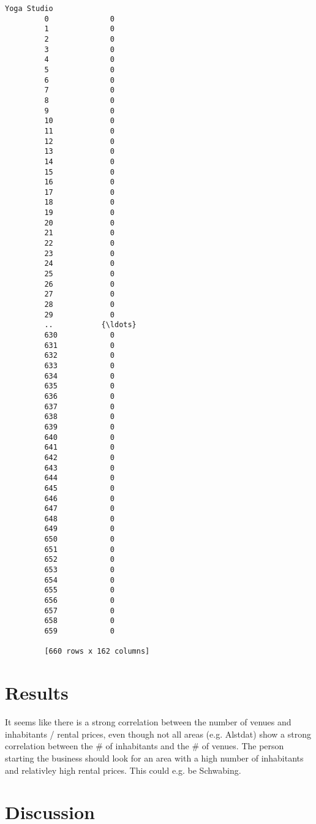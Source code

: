 \documentclass[11pt]{article}
\begin{document}
\begin{Verbatim}[commandchars=\\\{\}]
              Yoga Studio  
         0              0  
         1              0  
         2              0  
         3              0  
         4              0  
         5              0  
         6              0  
         7              0  
         8              0  
         9              0  
         10             0  
         11             0  
         12             0  
         13             0  
         14             0  
         15             0  
         16             0  
         17             0  
         18             0  
         19             0  
         20             0  
         21             0  
         22             0  
         23             0  
         24             0  
         25             0  
         26             0  
         27             0  
         28             0  
         29             0  
         ..           {\ldots}  
         630            0  
         631            0  
         632            0  
         633            0  
         634            0  
         635            0  
         636            0  
         637            0  
         638            0  
         639            0  
         640            0  
         641            0  
         642            0  
         643            0  
         644            0  
         645            0  
         646            0  
         647            0  
         648            0  
         649            0  
         650            0  
         651            0  
         652            0  
         653            0  
         654            0  
         655            0  
         656            0  
         657            0  
         658            0  
         659            0  
         
         [660 rows x 162 columns]
\end{Verbatim}
            
    \section{Results}\label{results}

It seems like there is a strong correlation between the number of venues
and inhabitants / rental prices, even though not all areas (e.g.
Alstdat) show a strong correlation between the \# of inhabitants and the
\# of venues. The person starting the business should look for an area
with a high number of inhabitants and relativley high rental prices.
This could e.g. be Schwabing.

    \section{Discussion}\label{discussion}
\end{document}
